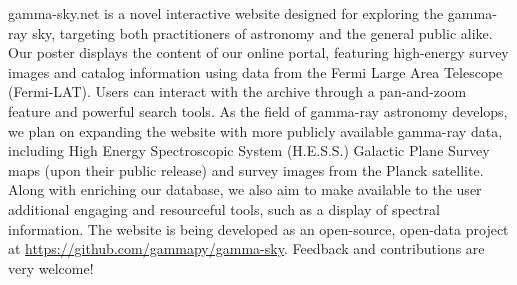 gamma-sky.net is a novel interactive website designed for exploring the gamma-ray sky, 
targeting both practitioners of astronomy and the general public alike. Our poster displays the 
content of our online portal, featuring high-energy survey images and catalog information using 
data from the Fermi Large Area Telescope (Fermi-LAT).  Users can interact with the archive 
through a pan-and-zoom feature and powerful search tools. As the field of gamma-ray astronomy 
develops, we plan on expanding the website with more publicly available gamma-ray data, 
including High Energy Spectroscopic System (H.E.S.S.) Galactic Plane Survey maps (upon their 
public release) and survey images from the Planck satellite. Along with enriching our database, 
we also aim to make available to the user additional engaging and resourceful tools, such as a 
display of spectral information. The website is being developed as an open-source, open-data 
project at \url{https://github.com/gammapy/gamma-sky}. Feedback and contributions are very 
welcome!
